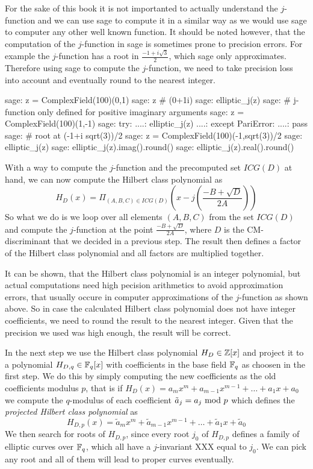 For the sake of this book it is not importanted to actually understand the $j$-function and we can use sage to compute it in a similar way as we would use sage to computer any other well known function. It should be noted however, that the computation of the $j$-function in sage is sometimes prone to precision errors. For example the $j$-function has a root in $\frac{-1+i\sqrt{3}}{2}$, which sage only approximates. Therefore using sage to compute the $j$-function, we need to take precision loss into account and eventually round to the nearest integer.
\begin{sagecommandline}
sage: z = ComplexField(100)(0,1)
sage: z # (0+1i)
sage: elliptic_j(z)
sage: # j-function only defined for positive imaginary arguments
sage: z = ComplexField(100)(1,-1)
sage: try:
....:     elliptic_j(z)
....: except PariError:
....:     pass
sage: # root at (-1+i sqrt(3))/2
sage: z = ComplexField(100)(-1,sqrt(3))/2
sage: elliptic_j(z)
sage: elliptic_j(z).imag().round()
sage: elliptic_j(z).real().round()
\end{sagecommandline}
With a way to compute the $j$-function and the precomputed set $ICG(D)$ at hand, we can now compute the Hilbert class polynomial as
\begin{equation}
H_D(x) = \Pi_{(A,B,C)\in ICG(D)} \left(x - j\left(\frac{-B + \sqrt{D}}{2A}\right)\right)
\end{equation}
So what we do is we loop over all elements $(A,B,C)$ from the set $ICG(D)$ and compute the $j$-function at the point $\frac{-B + \sqrt{D}}{2A}$, where $D$ is the CM-discriminant that we decided in a previous step. The result then defines a factor of the Hilbert class polynomial and all factors are multiplied together.

It can be shown, that the Hilbert class polynomial is an integer polynomial, but actual computations need high pecision arithmetics to avoid approximation errors, that usually occure in computer approximations of the $j$-function as shown above. So in case the calculated Hilbert class polynomial does not have integer coefficients, we need to round the result to the nearest integer. Given that the precision we used was high enough, the result will be correct.

In the next step we use the Hilbert class polynomial $H_D\in \mathbb{Z}[x]$ and project it to a polynomial $H_{D,q}\in\mathbb{F}_q[x]$ with coefficients in the base field $\mathbb{F}_q$ as choosen in the first step. We do this by simply computing the new coefficients as the old coefficients modulus $p$, that is if $H_D(x)= a_mx^m +a_{m-1}x^{m-1}+\ldots + a_1 x + a_0$ we compute the $q$-modulus of each coefficient
$\tilde{a}_j = a_j \text{ mod } p$ which defines the \textit{projected Hilbert class polynomial} as
$$
H_{D,p}(x)=\tilde{a}_mx^m +\tilde{a}_{m-1}x^{m-1}+\ldots + \tilde{a}_1 x + \tilde{a}_0
$$
We then search for roots of $H_{D,p}$, since every root $j_0$ of $H_{D,p}$ defines a family of elliptic curves over $\mathbb{F}_q$, which all have a $j$-invariant XXX equal to $j_0$. We can pick any root and all of them will lead to proper curves eventually.

